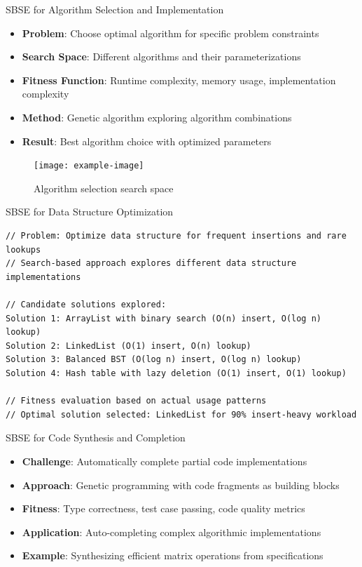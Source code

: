 \documentclass{beamer}
\begin{document}
\begin{frame}[t]{SBSE for Algorithm Selection and Implementation}
\begin{itemize}
\item \textbf{Problem}: Choose optimal algorithm for specific problem constraints
\item \textbf{Search Space}: Different algorithms and their parameterizations
\item \textbf{Fitness Function}: Runtime complexity, memory usage, implementation complexity
\item \textbf{Method}: Genetic algorithm exploring algorithm combinations
\item \textbf{Result}: Best algorithm choice with optimized parameters
\end{itemize}
\begin{figure}
\texttt{[image: example-image]}
\caption{Algorithm selection search space}
\end{figure}
\end{frame}

\begin{frame}[fragile,t]{SBSE for Data Structure Optimization}
\begin{verbatim}
// Problem: Optimize data structure for frequent insertions and rare lookups
// Search-based approach explores different data structure implementations

// Candidate solutions explored:
Solution 1: ArrayList with binary search (O(n) insert, O(log n) lookup)
Solution 2: LinkedList (O(1) insert, O(n) lookup)  
Solution 3: Balanced BST (O(log n) insert, O(log n) lookup)
Solution 4: Hash table with lazy deletion (O(1) insert, O(1) lookup)

// Fitness evaluation based on actual usage patterns
// Optimal solution selected: LinkedList for 90% insert-heavy workload
\end{verbatim}
\end{frame}

\begin{frame}[t]{SBSE for Code Synthesis and Completion}
\begin{itemize}
\item \textbf{Challenge}: Automatically complete partial code implementations
\item \textbf{Approach}: Genetic programming with code fragments as building blocks
\item \textbf{Fitness}: Type correctness, test case passing, code quality metrics
\item \textbf{Application}: Auto-completing complex algorithmic implementations
\item \textbf{Example}: Synthesizing efficient matrix operations from specifications
\end{itemize}
\end{frame}
\end{document}
